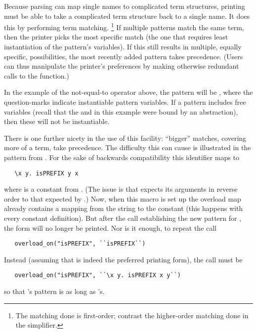 Because parsing can map single names to complicated term structures,
printing must be able to take a complicated term structure back to a
single name.  It does this by performing
term matching.%
%
%
\footnote{The matching done is first-order; contrast the higher-order
  matching done in the simplifier.}
If multiple patterns match the same term, then the printer picks the
most specific match (the one that requires least instantiation of the
pattern's variables).  If this still results in multiple, equally
specific, possibilities, the most recently added pattern takes
precedence.  (Users can thus manipulate the printer's preferences by
making otherwise redundant calls to the  function.)

In the example of the not-equal-to operator above, the pattern will be
, where the question-marks indicate instantiable
pattern variables.  If a pattern includes free variables (recall that
the  and  in this example were bound by an abstraction),
then these will not be instantiable.

There is one further nicety in the use of this facility: ``bigger''
matches, covering more of a term, take precedence.   The difficulty
this can cause is illustrated in the  pattern from
.  For the sake of backwards compatibility
this identifier maps to
\begin{verbatim}
   \x y. isPREFIX y x
\end{verbatim}
where  is a constant from .
(The issue is that  expects its arguments in
reverse order to that expected by .) Now, when this
macro is set up the overload map already contains a mapping from the
string  to the constant  (this
happens with every constant definition).  But after the call
establishing the new pattern for , the
 form will no longer be printed.  Nor is it enough,
to repeat the call
\begin{verbatim}
   overload_on("isPREFIX", ``isPREFIX``)
\end{verbatim}
Instead (assuming that  is indeed the preferred
printing form), the call must be
\begin{verbatim}
   overload_on("isPREFIX", ``\x y. isPREFIX x y``)
\end{verbatim}
so that 's pattern is as long as 's.


